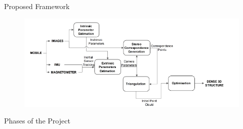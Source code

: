 \documentclass{beamer}
\begin{document}
\begin{frame}{Proposed Framework}{}
  \begin{figure}[ht!]
    \centering
    \includegraphics[width=\linewidth]{our_pipeline.png}
  \end{figure}
\end{frame}

\begin{frame}{Phases of the Project}{}
\end{frame}
\end{document}

